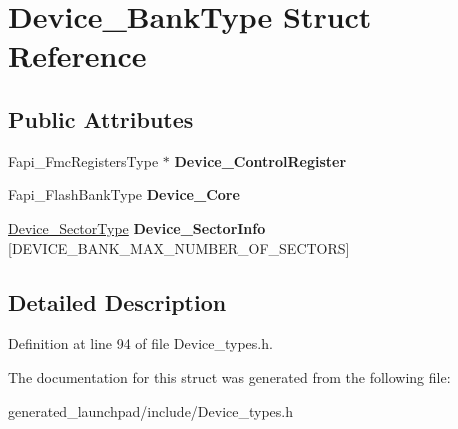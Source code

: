 \hypertarget{structDevice__BankType}{}\section{Device\+\_\+\+Bank\+Type Struct Reference}
\label{structDevice__BankType}
\subsection*{Public Attributes}
\begin{DoxyCompactItemize}
\item 
\mbox{\label{structDevice__BankType_a36211fad634872f704a479d102a01483}} 
Fapi\+\_\+\+Fmc\+Registers\+Type $\ast$ {\bfseries Device\+\_\+\+Control\+Register}
\item 
\mbox{\label{structDevice__BankType_a6db190400cb07b176a92745adcac9f81}} 
Fapi\+\_\+\+Flash\+Bank\+Type {\bfseries Device\+\_\+\+Core}
\item 
\mbox{\label{structDevice__BankType_abd22848f5dc69ba9b1efb3787280685d}} 
\mbox{\hyperlink{structDevice__SectorType}{Device\+\_\+\+Sector\+Type}} {\bfseries Device\+\_\+\+Sector\+Info} \mbox{[}D\+E\+V\+I\+C\+E\+\_\+\+B\+A\+N\+K\+\_\+\+M\+A\+X\+\_\+\+N\+U\+M\+B\+E\+R\+\_\+\+O\+F\+\_\+\+S\+E\+C\+T\+O\+RS\mbox{]}
\end{DoxyCompactItemize}


\subsection{Detailed Description}


Definition at line 94 of file Device\+\_\+types.\+h.



The documentation for this struct was generated from the following file\+:\begin{DoxyCompactItemize}
\item 
generated\+\_\+launchpad/include/Device\+\_\+types.\+h\end{DoxyCompactItemize}
